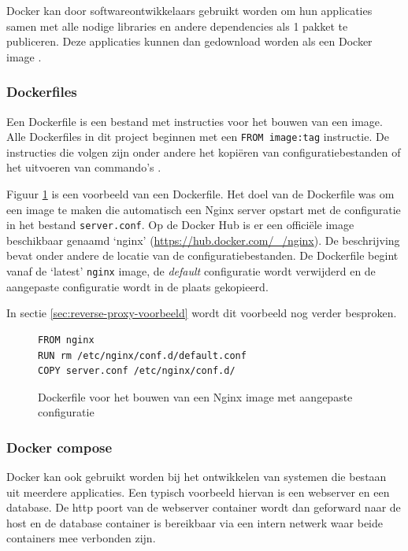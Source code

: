 \documentclass[a4paper,12pt]{report}
\begin{document}
Docker kan door softwareontwikkelaars gebruikt worden om hun applicaties samen met alle nodige libraries en andere dependencies als 1 pakket te publiceren.
Deze applicaties kunnen dan gedownload worden als een Docker image \autocite{docker:containers}.

\subsubsection{Dockerfiles}
Een Dockerfile is een bestand met instructies voor het bouwen van een image.
Alle Dockerfiles in dit project beginnen met een \lstinline|FROM image:tag| instructie.
De instructies die volgen zijn onder andere het kopiëren van configuratiebestanden of het uitvoeren van commando's \autocite{docker:dockerfile}.

Figuur \ref{fig:dockerfile-example} is een voorbeeld van een Dockerfile.
Het doel van de Dockerfile was om een image te maken die automatisch een Nginx server opstart met de configuratie in het bestand \lstinline|server.conf|.
Op de Docker Hub is er een officiële image beschikbaar genaamd `nginx' (\url{https://hub.docker.com/_/nginx}).
De beschrijving bevat onder andere de locatie van de configuratiebestanden.
De Dockerfile begint vanaf de `latest' \lstinline|nginx| image, de \emph{default} configuratie wordt verwijderd en de aangepaste configuratie wordt in de plaats gekopieerd.

In sectie \ref{sec:reverse-proxy-voorbeeld} wordt dit voorbeeld nog verder besproken.

\begin{figure}[H]
  \begin{lstlisting}
FROM nginx
RUN rm /etc/nginx/conf.d/default.conf
COPY server.conf /etc/nginx/conf.d/
  \end{lstlisting}
  \caption{Dockerfile voor het bouwen van een Nginx image met aangepaste configuratie}
  \label{fig:dockerfile-example}
\end{figure}

\subsubsection{Docker compose}
Docker kan ook gebruikt worden bij het ontwikkelen van systemen die bestaan uit meerdere applicaties.
Een typisch voorbeeld hiervan is een webserver en een database.
De http poort van de webserver container wordt dan geforward naar de host en de database container is bereikbaar via een intern netwerk waar beide containers mee verbonden zijn.
\end{document}

